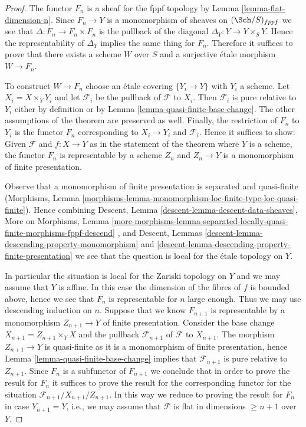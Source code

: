 \begin{proof}
The functor $F_n$ is a sheaf for the fppf topology by
Lemma \ref{lemma-flat-dimension-n}.
Since $F_n \to Y$ is a monomorphism of sheaves on
$(\Sch/S)_{fppf}$ we see that $\Delta : F_n \to F_n \times F_n$
is the pullback of the diagonal $\Delta_Y : Y \to Y \times_S Y$.
Hence the representability of $\Delta_Y$ implies the same
thing for $F_n$. Therefore it suffices to prove that
there exists a scheme $W$ over $S$ and a surjective \'etale morphism
$W \to F_n$.

\medskip\noindent
To construct $W \to F_n$ choose an \'etale covering $\{Y_i \to Y\}$
with $Y_i$ a scheme. Let $X_i = X \times_Y Y_i$ and let
$\mathcal{F}_i$ be the pullback of $\mathcal{F}$ to $X_i$.
Then $\mathcal{F}_i$ is pure relative to $Y_i$ either by definition
or by Lemma \ref{lemma-quasi-finite-base-change}.
The other assumptions of the theorem are preserved as well.
Finally, the restriction of $F_n$ to $Y_i$ is
the functor $F_n$ corresponding to $X_i \to Y_i$ and $\mathcal{F}_i$.
Hence it suffices to show: Given $\mathcal{F}$ and $f : X \to Y$
as in the statement of the theorem where $Y$ is a scheme, the
functor $F_n$ is representable by a scheme $Z_n$ and
$Z_n \to Y$ is a monomorphism of finite presentation.

\medskip\noindent
Observe that a monomorphism of finite presentation is
separated and quasi-finite (Morphisms, Lemma
\ref{morphisms-lemma-monomorphism-loc-finite-type-loc-quasi-finite}).
Hence combining
Descent, Lemma \ref{descent-lemma-descent-data-sheaves},
More on Morphisms, Lemma
\ref{more-morphisms-lemma-separated-locally-quasi-finite-morphisms-fppf-descend}
, and
Descent, Lemmas \ref{descent-lemma-descending-property-monomorphism} and
\ref{descent-lemma-descending-property-finite-presentation}
we see that the question is local for the \'etale topology on $Y$.

\medskip\noindent
In particular the situation is local for the Zariski topology on $Y$
and we may assume that $Y$ is affine. In this case the dimension of the
fibres of $f$ is bounded above, hence we see that $F_n$ is representable
for $n$ large enough. Thus we may use descending induction on $n$.
Suppose that we know $F_{n + 1}$ is representable by a monomorphism
$Z_{n + 1} \to Y$ of finite presentation. Consider the base change
$X_{n + 1} = Z_{n + 1} \times_Y X$ and the pullback $\mathcal{F}_{n + 1}$
of $\mathcal{F}$ to $X_{n + 1}$. The morphism $Z_{n + 1} \to Y$ is
quasi-finite as it is a monomorphism of finite presentation, hence
Lemma \ref{lemma-quasi-finite-base-change}
implies that $\mathcal{F}_{n + 1}$ is pure relative to $Z_{n + 1}$.
Since $F_n$ is a subfunctor of $F_{n + 1}$ we conclude that in order
to prove the result for $F_n$ it suffices to prove the result for the
corresponding functor for the situation
$\mathcal{F}_{n + 1}/X_{n + 1}/Z_{n + 1}$.
In this way we reduce to proving the result for $F_n$ in case
$Y_{n + 1} = Y$, i.e., we may assume that $\mathcal{F}$ is flat
in dimensions $\geq n + 1$ over $Y$.


\end{proof}
